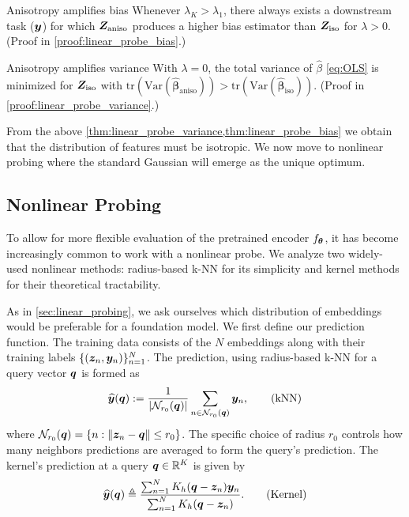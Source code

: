 \begin{lemma}[label={thm:linear_probe_bias}]{Anisotropy amplifies bias}{}
Whenever $\lambda_K>\lambda_1$, there always exists a downstream task (${\bm{y}}$) for which ${\bm{Z}}_{\rm aniso}$ produces a higher bias estimator than ${\bm{Z}}_{\rm iso}$ for $\lambda>0$. (Proof in \cref{proof:linear_probe_bias}.)
\end{lemma}
\begin{lemma}[label={thm:linear_probe_variance}]{Anisotropy amplifies variance}{}
With $\lambda=0$, the total variance of $\hat{\beta}$ \eqref{eq:OLS} is minimized for ${\bm{Z}}_{\rm iso}$ with
$\text{tr}(\text{Var}(\hat{\boldsymbol{\beta}}_{\text{aniso}})) > \text{tr}(\text{Var}(\hat{\boldsymbol{\beta}}_{\text{iso}}))$. (Proof in \cref{proof:linear_probe_variance}.)
\end{lemma}



From the above \cref{thm:linear_probe_variance,thm:linear_probe_bias} we obtain that the distribution of features must be isotropic. We now move to nonlinear probing where the standard Gaussian will emerge as the unique optimum.


\subsection{Nonlinear Probing}
\label{sec:nonlinear_probing}


To allow for more flexible evaluation of the pretrained encoder $f_{{\bm{\theta}}}$, it has become increasingly common to work with a nonlinear probe. We analyze two widely-used nonlinear methods: radius-based k-NN \citep{taunk2019brief,sun2010adaptive,zhang2017efficient,abu2019effects} for 
its simplicity and kernel methods \citep{nadaraya1964estimating,watson1964smooth} for their theoretical tractability. 

As in \cref{sec:linear_probing}, we ask ourselves which distribution of embeddings would be preferable for a foundation model. We first define our prediction function. The training data consists of the $N$ embeddings along with their training labels $\{({\bm{z}}_n,{\bm{y}}_{n})\}_{n=1}^{N}$. The prediction, using radius-based k-NN for a query vector ${\bm{q}}$ is formed as
\begin{align}
\widehat{{\bm{y}}}({\bm{q}}) := \frac{1}{|\mathcal{N}_{r_0}({\bm{q}})|}\sum_{n \in \mathcal{N}_{r_0}({\bm{q}})}{\bm{y}}_n,
\tag{kNN}\label{eq:kNN}
\end{align}
where $\mathcal{N}_{r_0}({\bm{q}}) = \{n : \|{\bm{z}}_n - {\bm{q}}\| \le r_0\}$. The specific choice of radius $r_0$ controls how many neighbors predictions are averaged to form the query's prediction. The kernel's prediction at a query ${\bm{q}}\in\mathbb{R}^K$ is given by
\begin{align}
\widehat {{\bm{y}}}({\bm{q}})\triangleq \frac{\sum_{n=1}^N K_h({\bm{q}}-{\bm{z}}_n){\bm{y}}_n}{\sum_{n=1}^N K_h({\bm{q}}-{\bm{z}}_n)}.\tag{Kernel}\label{eq:NW}
\end{align}


